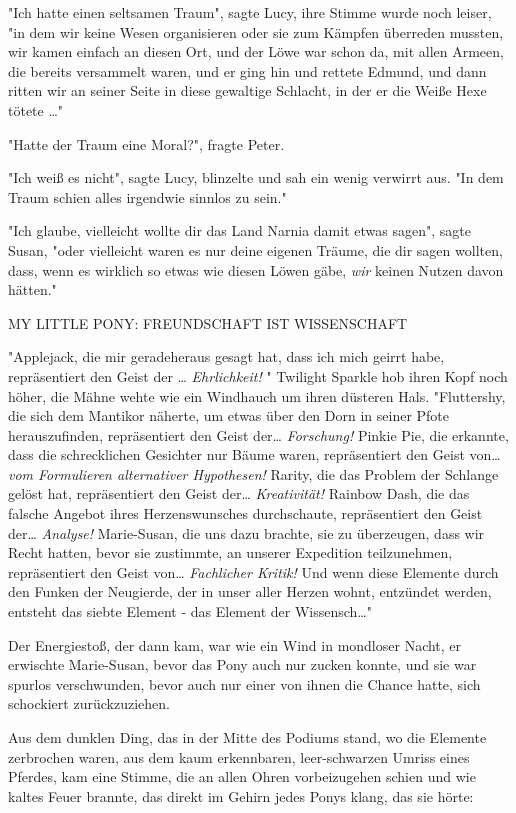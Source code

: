{"Ich hatte einen seltsamen Traum", sagte Lucy, ihre Stimme wurde noch leiser, "in dem wir keine Wesen organisieren oder sie zum Kämpfen überreden mussten, wir kamen einfach an diesen Ort, und der Löwe war schon da, mit allen Armeen, die bereits versammelt waren, und er ging hin und rettete Edmund, und dann ritten wir an seiner Seite in diese gewaltige Schlacht, in der er die Weiße Hexe tötete …"

"Hatte der Traum eine Moral?", fragte Peter.

"Ich weiß es nicht", sagte Lucy, blinzelte und sah ein wenig verwirrt aus. "In dem Traum schien alles irgendwie sinnlos zu sein."

"Ich glaube, vielleicht wollte dir das Land Narnia damit etwas sagen", sagte Susan, "oder vielleicht waren es nur deine eigenen Träume, die dir sagen wollten, dass, wenn es wirklich so etwas wie diesen Löwen gäbe, \emph{wir} keinen Nutzen davon hätten."

MY LITTLE PONY: FREUNDSCHAFT IST WISSENSCHAFT

"Applejack, die mir geradeheraus gesagt hat, dass ich mich geirrt habe, repräsentiert den Geist der … \emph{Ehrlichkeit!} " Twilight Sparkle hob ihren Kopf noch höher, die Mähne wehte wie ein Windhauch um ihren düsteren Hals. "Fluttershy, die sich dem Mantikor näherte, um etwas über den Dorn in seiner Pfote herauszufinden, repräsentiert den Geist der… \emph{Forschung!} Pinkie Pie, die erkannte, dass die schrecklichen Gesichter nur Bäume waren, repräsentiert den Geist von… \emph{vom Formulieren alternativer Hypothesen!} Rarity, die das Problem der Schlange gelöst hat, repräsentiert den Geist der… \emph{Kreativität!} Rainbow Dash, die das falsche Angebot ihres Herzenswunsches durchschaute, repräsentiert den Geist der… \emph{Analyse!} Marie-Susan, die uns dazu brachte, sie zu überzeugen, dass wir Recht hatten, bevor sie zustimmte, an unserer Expedition teilzunehmen, repräsentiert den Geist von… \emph{Fachlicher Kritik!} Und wenn diese Elemente durch den Funken der Neugierde, der in unser aller Herzen wohnt, entzündet werden, entsteht das siebte Element - das Element der Wissensch…"

Der Energiestoß, der dann kam, war wie ein Wind in mondloser Nacht, er erwischte Marie-Susan, bevor das Pony auch nur zucken konnte, und sie war spurlos verschwunden, bevor auch nur einer von ihnen die Chance hatte, sich schockiert zurückzuziehen.

Aus dem dunklen Ding, das in der Mitte des Podiums stand, wo die Elemente zerbrochen waren, aus dem kaum erkennbaren, leer-schwarzen Umriss eines Pferdes, kam eine Stimme, die an allen Ohren vorbeizugehen schien und wie kaltes Feuer brannte, das direkt im Gehirn jedes Ponys klang, das sie hörte:

}

